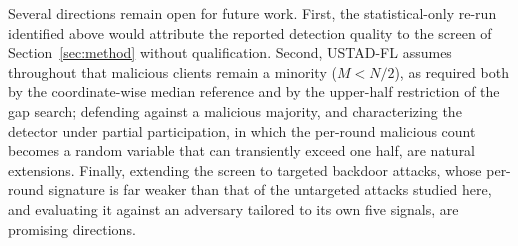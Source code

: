 \documentclass[journal]{IEEEtran}
\begin{document}
Several directions remain open for future work. First, the statistical-only re-run identified above would attribute the reported detection quality to the screen of Section~\ref{sec:method} without qualification. Second, USTAD-FL assumes throughout that malicious clients remain a minority ($M < N/2$), as required both by the coordinate-wise median reference and by the upper-half restriction of the gap search; defending against a malicious majority, and characterizing the detector under partial participation, in which the per-round malicious count becomes a random variable that can transiently exceed one half, are natural extensions. Finally, extending the screen to targeted backdoor attacks, whose per-round signature is far weaker than that of the untargeted attacks studied here, and evaluating it against an adversary tailored to its own five signals, are promising directions.
\end{document}
